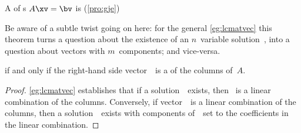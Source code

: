 \begin{theorem} \label{thm:conlincom} 
A  of s \(A\xv=\bv\) is  (\autoref{pro:gje}) 
\begin{aside}
Be aware of a subtle twist going on here: for the general \autoref{eg:lcmatvec} this theorem turns a question about the existence of an \(n\)~variable solution~\xv, into a question about vectors with \(m\)~components; and vice-versa.
\end{aside}%
if and only if the right-hand side vector~\bv\ is a  of the columns of~\(A\).
\end{theorem}

\begin{proof} 
\autoref{eg:lcmatvec} establishes that if a solution~\xv\ exists, then \bv~is a linear combination of the columns.
Conversely, if vector~\bv\ is a linear combination of the columns, then a solution~\xv\ exists with components of~\xv\ set to the coefficients in the linear combination.
\end{proof}


